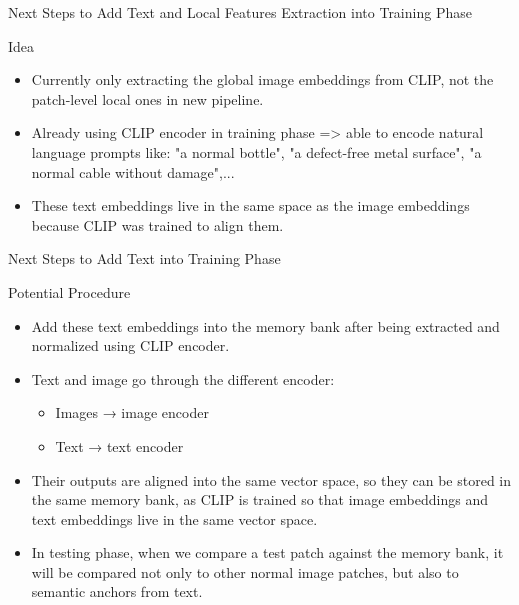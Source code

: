 \begin{frame}{Next Steps to Add Text and Local Features Extraction into Training Phase}
\begin{block}{Idea}
    \begin{itemize}
        \item Currently only extracting the global image embeddings from CLIP, not the patch-level local ones in new pipeline.
        \item Already using CLIP encoder in training phase => able to encode natural language prompts like: "a normal bottle", "a defect-free metal surface", "a normal cable without damage",...
        \item These text embeddings live in the same space as the image embeddings because CLIP was trained to align them.
    \end{itemize}
\end{block}    
\end{frame}
\begin{frame}{Next Steps to Add Text into Training Phase}
\begin{block}{Potential Procedure}
    \begin{itemize}
        \item Add these text embeddings into the memory bank after being extracted and normalized using CLIP encoder.
        \item Text and image go through the different encoder:
        \begin{itemize}
            \item Images → image encoder
            \item Text → text encoder
        \end{itemize}
        \item Their outputs are aligned into the same vector space, so they can be stored in the same memory bank, as CLIP is trained so that image embeddings and text embeddings live in the same vector space.
        \item In testing phase, when we compare a test patch against the memory bank, it will be compared not only to other normal image patches, but also to semantic anchors from text.
    \end{itemize}
\end{block}    
\end{frame}